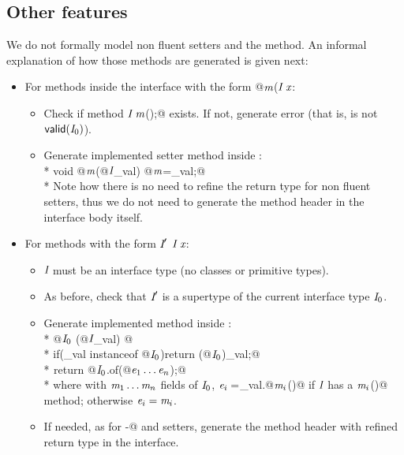 \subsection{Other features}

We do not formally model non fluent setters and the \Q@with@ method. 
An informal explanation of how those methods are generated is given next:
\begin{itemize}
\item For methods inside the interface with the form \Q@void @$\textit{m}$\QM($\C\ \x$\QM{);}:
  \begin{itemize}
    \item Check if method $\textit{I}\ \textit{m}$\Q@();@ exists. If not, generate error (that is, is not $\textsf{valid}(\textit{I}_0)$).
    \item Generate implemented setter method inside \Q@of@:\\*
           \Q@public void @$\textit{m}$\Q@(@$\textit{I}$\Q@ _val) { @$\textit{m}$\Q@=_val;}@\\*
    Note how there is no need to refine the return type for non fluent setters, thus we do not need to generate the method header in the interface body itself.
    \end{itemize}
\item For methods with the form $\C'\ $$\C\ \x$\QM{);}:
  \begin{itemize}
   \item $\textit{I}$ must be an interface type (no classes or primitive types).
    \item As before, check that $\textit{I}'$ is a supertype of the current interface type $\textit{I}_0$.
    \item Generate implemented \Q@with@ method inside \Q@of@:\\*
           \Q@public @$\textit{I}_0\ $\Q@with(@$\textit{I}$\Q@ _val) { @\\*
           \Q@  if(_val instanceof @$\textit{I}_0$\Q@){return (@$\textit{I}_0$\Q@)_val;}@\\*
${}_{}$\Q@  return @$\textit{I}_0$\Q@.of(@$\textit{e}_1\ldots\textit{e}_n$\Q@);}@\\*
where with $\textit{m}_1\ldots\textit{m}_n$  fields of $\textit{I}_0$,
$\textit{e}_i=$\Q@_val.@$\textit{m}_i$\Q@()@ if $\textit{I}$ has a $\textit{m}_i$\Q@()@ method; otherwise
$\textit{e}_i=\textit{m}_i$.
    \item If needed, as for \Q@with-@ and setters, generate the method header with refined return type in the interface.
 \end{itemize}

\end{itemize}
